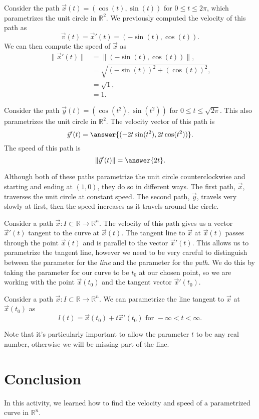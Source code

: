 \documentclass{ximera}
\begin{document}
\begin{example}
Consider the path $\vec{x}(t) = (\cos(t), \sin(t))$ for $0\leq t \leq 2\pi$, which parametrizes the unit circle in $\mathbb{R}^2$. We previously computed the velocity of this path as
\[
\vec{v}(t) = \vec{x}'(t) = (-\sin(t), \cos(t)).
\]
We can then compute the speed of $\vec{x}$ as
\begin{align*}
\|\vec{x}'(t)\| &= \|(-\sin(t), \cos(t))\|,\\
&= \sqrt{(-\sin(t))^2 + (\cos(t))^2},\\
& = \sqrt{1},\\
& = 1.
\end{align*}

Consider the path $\vec{y}(t) = (\cos(t^2), \sin(t^2))$ for $0\leq t\leq \sqrt{2\pi}$. This also parametrizes the unit circle in $\mathbb{R}^2$. The velocity vector of this path is
\[
\vec{y}'(t) = \answer{(-2t\sin(t^2), 2t\cos(t^2))}.
\]
The speed of this path is
\[
\|\vec{y}'(t)\| = \answer{2t}.
\]

Although both of these paths parametrize the unit circle counterclockwise and starting and ending at $(1,0)$, they do so in different ways. The first path, $\vec{x}$, traverses the unit circle at constant speed. The second path, $\vec{y}$, travels very slowly at first, then the speed increases as it travels around the circle.
\end{example}

Consider a path $\vec{x}:I\subset\mathbb{R}\rightarrow\mathbb{R}^n$. The velocity of this path gives us a vector $\vec{x}'(t)$ tangent to the curve at $\vec{x}(t)$. The tangent line to $\vec{x}$ at $\vec{x}(t)$ passes through the point $\vec{x}(t)$ and is parallel to the vector $\vec{x}'(t)$. This allows us to parametrize the tangent line, however we need to be very careful to distinguish between the parameter for the \emph{line} and the parameter for the \emph{path}. We do this by taking the parameter for our curve to be $t_0$ at our chosen point, so we are working with the point $\vec{x}(t_0)$ and the tangent vector $\vec{x}'(t_0)$.

\begin{proposition}
Consider a path $\vec{x}:I\subset\mathbb{R}\rightarrow\mathbb{R}^n$. We can parametrize the line tangent to $\vec{x}$ at $\vec{x}(t_0)$ as
\[
l(t) = \vec{x}(t_0) + t\vec{x}'(t_0) \textrm{ for } -\infty < t < \infty.
\]
\end{proposition}

Note that it's particularly important to allow the parameter $t$ to be any real number, otherwise we will be missing part of the line.

\section*{Conclusion}

In this activity, we learned how to find the velocity and speed of a parametrized curve in $\mathbb{R}^n$.
\end{document}
